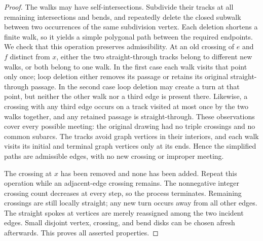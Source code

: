 \begin{proof}
The walks may have self-intersections.  Subdivide their tracks at
all remaining intersections and bends, and repeatedly delete the
closed subwalk between two occurrences of the same subdivision
vertex.  Each deletion shortens a finite walk, so it yields a simple
polygonal path between the required endpoints.  We check that this
operation preserves admissibility.  At an old crossing of $e$ and
$f$ distinct from $x$, either the two straight-through tracks belong
to different new walks, or both belong to one walk.  In the first
case each walk visits that point only once; loop deletion either
removes its passage or retains its original straight-through
passage.  In the second case loop deletion may create a turn at that
point, but neither the other walk nor a third edge is present there.
Likewise, a crossing with any third edge occurs on a track visited
at most once by the two walks together, and any retained passage is
straight-through.  These observations cover every possible meeting:
the original drawing had no triple crossings and no common subarcs.
The tracks avoid graph vertices in their interiors, and each walk
visits its initial and terminal graph vertices only at its ends.
Hence the simplified paths are admissible edges, with no new
crossing or improper meeting.

The crossing at $x$ has been removed and none has been added.
Repeat this operation while an adjacent-edge crossing remains.  The
nonnegative integer crossing count decreases at every step, so the
process terminates.  Remaining crossings are still locally straight;
any new turn occurs away from all other edges.  The straight spokes
at vertices are merely reassigned among the two incident edges.
Small disjoint vertex, crossing, and bend disks can be chosen afresh
afterwards.  This proves all asserted properties.
\end{proof}
